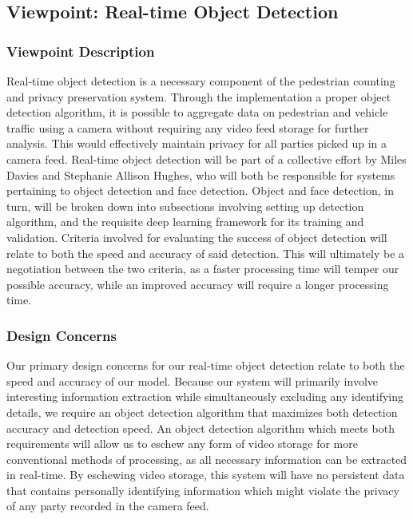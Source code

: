 \documentclass[onecolumn, draftclsnofoot,10pt, compsoc]{IEEEtran}
\begin{document}
\subsection{Viewpoint: Real-time Object Detection}
\subsubsection{Viewpoint Description}
Real-time object detection is a necessary component of the pedestrian counting and privacy preservation system. Through the implementation a proper object detection algorithm, it is possible to aggregate data on pedestrian and vehicle traffic using a camera without requiring any video feed storage for further analysis. This would effectively maintain privacy for all parties picked up in a camera feed. Real-time object detection will be part of a collective effort by Miles Davies and Stephanie Allison Hughes, who will both be responsible for systems pertaining to object detection and face detection. Object and face detection, in turn, will be broken down into subsections involving setting up detection algorithm, and the requisite deep learning framework for its training and validation. Criteria involved for evaluating the success of object detection will relate to both the speed and accuracy of said detection. This will ultimately be a negotiation between the two criteria, as a faster processing time will temper our possible accuracy, while an improved accuracy will require a longer processing time.
\subsubsection{Design Concerns}
Our primary design concerns for our real-time object detection relate to both the speed and accuracy of our model. Because our system will primarily involve interesting information extraction while simultaneously excluding any identifying details, we require an object detection algorithm that maximizes both detection accuracy and detection speed. An object detection algorithm which meets both requirements will allow us to eschew any form of video storage for more conventional methods of processing, as all necessary information can be extracted in real-time. By eschewing video storage, this system will have no persistent data that contains personally identifying information which might violate the privacy of any party recorded in the camera feed.
\end{document}
